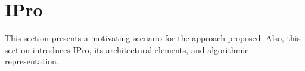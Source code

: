 \chapter{IPro}
\label{chapter:intelligent_probing}
This section presents a motivating scenario for the approach proposed. Also, this section introduces IPro, its architectural elements, and algorithmic representation.






